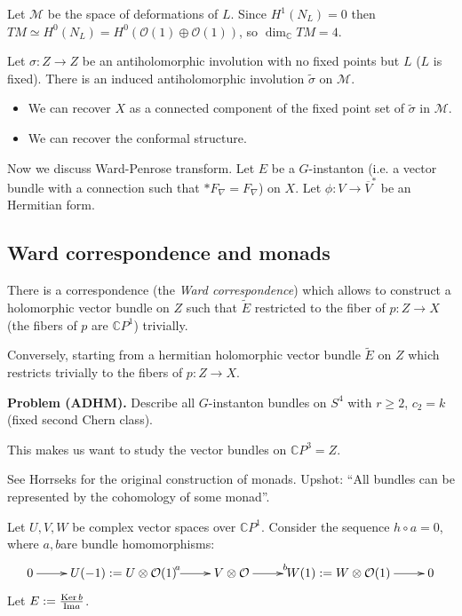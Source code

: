 Let $\mathcal{M}$ be the space of
deformations of $L$.
Since $H^1(N_L)=0$ then
$TM \simeq H^0(N_L) = H^0(\mathcal{O}(1)
\oplus \mathcal{O}(1))$,
so $\dim_\mathbb{C}TM=4$.

Let $\sigma:Z \to Z$ be an antiholomorphic
involution with no fixed points but $L$ ($L$
is fixed). There is an induced
antiholomorphic involution $\tilde{\sigma}$
on $\mathcal{M}$.

\begin{remark}
\label{remark-antiholomorphic-involution}
\begin{itemize}
\item We can recover $X$ as a connected
component
of the fixed point set of $\tilde{\sigma}$ in
$\mathcal{M}$.
\item We can recover the
conformal structure.
\end{itemize}
\end{remark}

\medskip\noindent
Now we discuss Ward-Penrose transform.
Let $E$ be a $G$-instanton
(i.e. a vector bundle with a connection such
that
$*F_\nabla=F_\nabla$) on $X$.
Let $\phi:V \to \overline{V}^*$ be an
Hermitian form.

\subsection{Ward correspondence and monads}
\label{subsection-ward-correspondence-monads}

There is a correspondence (the {\it Ward
correspondence})
which allows to construct a holomorphic
vector bundle on $Z$
such that $\tilde{E}$ restricted to the fiber
of $p:Z \to X$
(the fibers of $p$ are $\mathbb{C}P^1$)
trivially.

Conversely, starting from a hermitian
holomorphic vector bundle $\tilde{E}$
on $Z$ which restricts trivially to the
fibers of $p:Z \to X$.

\medskip\noindent
{\bf Problem (ADHM).} Describe all
$G$-instanton bundles on $S^4$
with $r \geq 2$, $c_2=k$ (fixed second Chern
class).

This makes us want to study the vector
bundles on $\mathbb{C}P^3=Z$.

See Horrseks for the original construction of
monads.
Upshot: ``All bundles can be represented by
the cohomology of some monad''.

\begin{definition}[Monad]
\label{definition-monad}
Let $U,V,W$ be complex vector spaces over
$\mathbb{C}P^1$.
Consider the sequence $h \circ a=0$, where
$a,b$are bundle homomorphisms:
$$
\xymatrix{
0\ar[r]&U(-1):=U \otimes \mathcal{O}(1)
\ar[r]^a
& V \otimes \mathcal{O}
\ar[r]^b
& W(1):=W \otimes \mathcal{O}(1)\ar[r]&0
}
$$
Let $E:=\frac{\mathop{\mathrm{Ker}} b}{\text{Im}a}$.
\end{definition}

